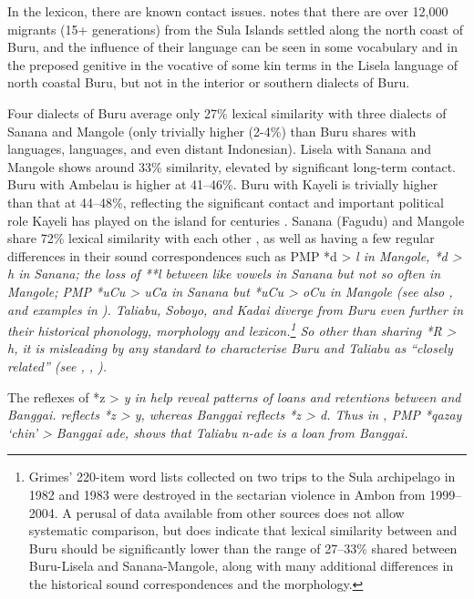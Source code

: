 In the lexicon, there are known contact issues.
\citet{Grimes1991c,Grimes2000a} notes that there are over 12,000 migrants
(15+ generations) from the Sula Islands settled along the north
coast of Buru, and the influence of their language can be seen in some vocabulary
and in the preposed genitive in the vocative of some kin terms
in the Lisela language of north coastal Buru,
but not in the interior or southern dialects of Buru.

Four dialects of Buru average only 27{\%} lexical similarity
with three dialects of Sanana
and Mangole (only trivially higher (2-4{\%}) than Buru shares
with  languages, 
languages, and even distant Indonesian).
Lisela with Sanana and Mangole shows around 33{\%} similarity,
elevated by significant long-term contact.
Buru with Ambelau is higher at 41--46{\%}.
Buru with Kayeli is trivially higher than that at 44--48{\%},
reflecting the significant contact
and important political role Kayeli has played
on the island for centuries \citep{Grimes2000a}.
Sanana (Fagudu) and Mangole share 72{\%} lexical similarity with
each other \citep{GrimesGrimes1994},
as well as having a few regular differences in their sound correspondences
such as PMP *d > \it{l} in Mangole,
*d > \it{h} in Sanana; the loss of **l between like vowels in
Sanana but not so often in Mangole; PMP *uCu > \it{uCa} in Sanana
but *uCu > \it{oCu} in Mangole (see also \citet{Bloyd2015,Bloyd2020},
and examples in ).
Taliabu, Soboyo, and Kadai diverge from Buru even further in their
historical phonology, morphology and lexicon.\footnote{
		Grimes’ 220-item word lists collected
		on two trips to the Sula archipelago in 1982
		and 1983 were destroyed in the sectarian violence in Ambon from 1999--2004.
		A perusal of data available from other sources
		\citep{Collins1981,Collins1989,Blust1981,Stokhof1980b}
		does not allow systematic comparison,
		but does indicate that lexical similarity between 
		and Buru should be significantly lower than the range of 27--33{\%}
		shared between Buru-Lisela and Sanana-Mangole,
		along with many additional differences in
		the historical sound correspondences
		and the morphology.}
So other than sharing *R > \it{h}, it
is misleading by any standard to characterise Buru
and Taliabu as “closely related”
(see \cite[31]{Collins1981}, \citeyear[78, 81, 84]{Collins1982c}, \citeyear[48]{Collins1983}).

The reflexes of *z > \it{y} in  help reveal patterns
of loans and retentions between  and Banggai.
 reflects *z > \it{y},
whereas Banggai reflects *z > \it{d}.
Thus in , PMP *qazay ‘chin’ > Banggai \it{ade},
shows that Taliabu \it{n-ade} is a loan from Banggai.

